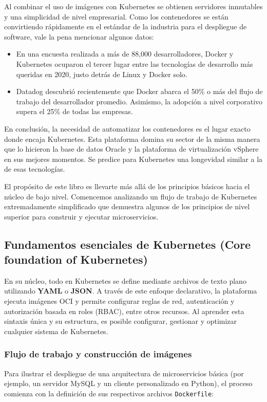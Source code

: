 Al combinar el uso de imágenes con Kubernetes se obtienen servidores 
inmutables y una simplicidad de nivel empresarial. Como los contenedores se están convirtiendo rápidamente en el estándar de la industria para 
el despliegue de software, vale la pena mencionar algunos datos:

\begin{itemize}
    \item En una encuesta realizada a más de 88,000 desarrolladores, 
    Docker y Kubernetes ocuparon el tercer lugar entre las tecnologías de desarrollo más queridas en 2020, justo detrás de Linux y Docker solo.
    \item Datadog descubrió recientemente que Docker abarca el 50\% o 
    más del flujo de trabajo del desarrollador promedio. Asimismo, la adopción a nivel corporativo supera el 25\% de todas las empresas.
\end{itemize}

En conclusión, la necesidad de automatizar los contenedores es el lugar 
exacto donde encaja Kubernetes. Esta plataforma domina su sector de la misma 
manera que lo hicieron la base de datos Oracle y la plataforma de virtualización vSphere en sus mejores momentos. Se predice para Kubernetes una 
longevidad similar a la de esas tecnologías. 

El propósito de este libro es llevarte más allá de los principios básicos 
hacia el núcleo de bajo nivel. Comencemos analizando un flujo de trabajo de Kubernetes extremadamente simplificado que demuestra algunos de los
 principios de nivel superior para construir y ejecutar microservicios.

\subsection{Fundamentos esenciales de Kubernetes (Core foundation of Kubernetes)}

En su núcleo, todo en Kubernetes se define mediante archivos de texto plano utilizando \textbf{YAML} o \textbf{JSON}. A través de este enfoque declarativo, la plataforma ejecuta imágenes OCI y permite configurar reglas de red, autenticación y autorización basada en roles (RBAC), entre otros recursos. Al aprender esta sintaxis única y su estructura, es posible configurar, gestionar y optimizar cualquier sistema de Kubernetes.

\subsubsection{Flujo de trabajo y construcción de imágenes}
Para ilustrar el despliegue de una arquitectura de microservicios básica (por ejemplo, un servidor MySQL y un cliente personalizado en Python), el proceso comienza con la definición de sus respectivos archivos \texttt{Dockerfile}:


